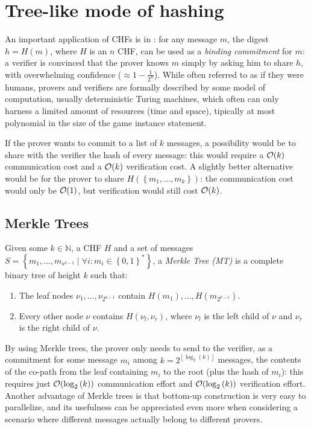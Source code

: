 \section{Tree-like mode of hashing}
An important application of CHFs is in :
for any message \(m\), the digest \(h = H\left(m\right)\), where \(H\) is an \(n\) CHF, can be
used as a \emph{binding commitment} for \(m\): a verifier is convinced that the prover knows \(m\)
simply by asking him to share \(h\), with overwhelming confidence (\(\approx 1 - \frac{1}{2^n}\)).
While often referred to as if they were humans, provers and verifiers are formally described by
some model of computation, usually deterministic Turing machines, which often can only harness a
limited amount of resources (time and space), tipically at most polynomial in the size of the game
instance statement.

If the prover wants to commit to a list of \(k\) messages, a possibility would be to share with the
verifier the hash of every message: this would require a \(\BigO{k}\) communication cost
and a \(\BigO{k}\) verification cost.
A slightly better alternative would be for the prover to share
\(H\left(\left\{m_1, \dots, m_k\right\}\right)\): the communication cost would only be
\(\BigO{1}\), but verification would still cost \(\BigO{k}\).

\subsection{Merkle Trees}
\begin{definition}
	Given some \(k \in \mathbb{N}\), a CHF \(H\) and a set of messages
	\(S = \left\{m_1, \dots, m_{s^{k-1}} \mid \forall i\colon m_i \in
	{\left\{0, 1\right\}}^*\right\} \), a \emph{Merkle Tree (MT)} is a complete binary tree of
	height \(k\) such that:
	\begin{enumerate}
		\item The leaf nodes \(\nu_1, \dots, \nu_{2^{k-1}}\) contain \(H\left(m_1\right), \dots,
		      H\left(m_{2^{k-1}}\right)\).
		\item Every other node \(\nu \) contains \(H\left(\nu_l, \nu_r\right)\), where \(\nu_l\) is
		      the left child of \(\nu \) and \(\nu_r\) is the right child of \(\nu \).
	\end{enumerate}
\end{definition}

By using Merkle trees, the prover only needs to send to the verifier, as a commitment for
some message \(m_i\) among \(k = 2^{\left\lfloor\log_2(k)\right\rfloor}\) messages, the contents of
the co-path from the leaf containing \(m_i\) to the root (plus the hash of \(m_i\)): this requires
just \(\BigO{\log_2\left(k\right)}\) communication effort and
\(\BigO{\log_2\left(k\right)}\) verification effort.
Another advantage of Merkle trees is that bottom-up construction is very easy to parallelize,
and its usefulness can be appreciated even more when considering a scenario where different
messages actually belong to different provers.


